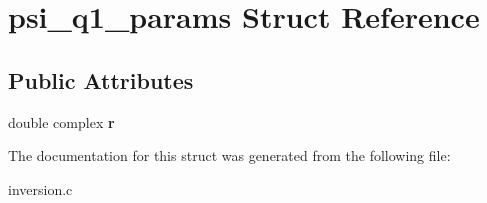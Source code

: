 \hypertarget{structpsi__q1__params}{}\section{psi\+\_\+q1\+\_\+params Struct Reference}
\label{structpsi__q1__params}
\subsection*{Public Attributes}
\begin{DoxyCompactItemize}
\item 
\mbox{\label{structpsi__q1__params_acce9e62f1f8694751b7755576add612d}} 
double complex {\bfseries r}
\end{DoxyCompactItemize}


The documentation for this struct was generated from the following file\+:\begin{DoxyCompactItemize}
\item 
inversion.\+c\end{DoxyCompactItemize}
